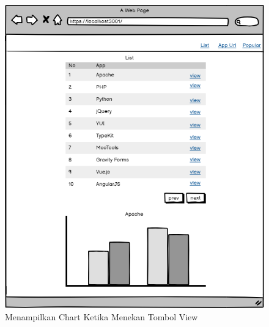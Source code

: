 \begin{figure}[H]
	\centering  
	\includegraphics[scale=0.7]{Gambar/list2.png}  
	\caption{Menampilkan Chart Ketika Menekan Tombol View} 
	\label{fig:list2} 
\end{figure}

